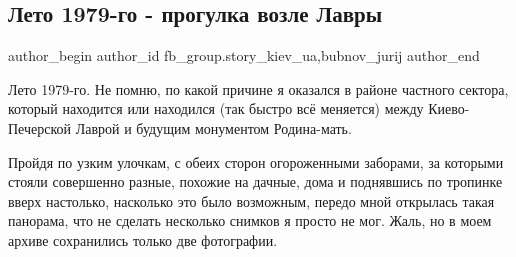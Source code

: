  
 
 
 
 
 
\subsection{Лето 1979-го - прогулка возле Лавры}
\label{sec:12_11_2021.fb.fb_group.story_kiev_ua.1.leto_1979_lavra_pushka}
 
\ifcmt
 author_begin
   author_id fb_group.story_kiev_ua,bubnov_jurij
 author_end
\fi


Лето 1979-го. Не помню, по какой причине я оказался в районе частного сектора,
который находится или находился (так быстро всё меняется) между Киево-Печерской
Лаврой и будущим монументом Родина-мать. 

\begin{multicols}{2} %
\setlength{\parindent}{0pt}

Пройдя по узким улочкам, с обеих
сторон огороженными заборами, за которыми стояли совершенно разные, похожие на
дачные, дома и поднявшись по тропинке вверх настолько, насколько это было
возможным, передо мной открылась такая панорама, что не сделать несколько
снимков я просто не мог. Жаль, но в моем архиве сохранились только две
фотографии.


\end{multicols} %

